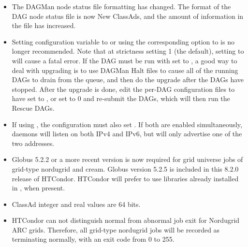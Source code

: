 \begin{itemize}
\item The DAGMan node status file formatting has changed.
The format of the DAG node status file is now New ClassAds,
and the amount of information in the file has increased.

\item Setting configuration variable
 to 
or using the corresponding  option
to  is no longer recommended.
Note that at strictness setting 1 (the default), setting
 to 
will cause a fatal error. 
If the DAG must be run with  
set to ,
a good way to deal with upgrading is to use DAGMan Halt files 
to cause all of the running DAGs to drain from the queue, 
and then do the upgrade after the DAGs have stopped.  
After the upgrade is done, 
edit the per-DAG configuration files to have 
 set to ,
or set  to 0 and 
re-submit the DAGs, which will then run the Rescue DAGs.

\item If using , the configuration must
also set .
If both are enabled simultaneously,
daemons will listen on both IPv4 and IPv6, 
but will only advertise one of the two addresses.

\item Globus 5.2.2 or a more recent version is now required 
for grid universe jobs of grid-type nordugrid and cream.
Globus version 5.2.5 is included in this 8.2.0 release of HTCondor.
HTCondor will prefer to use libraries already installed in ,
when present.

\item ClassAd integer and real values are 64 bits.

\item HTCondor can not distinguish normal from abnormal job exit
for Nordugrid ARC grids.
Therefore, all grid-type nordugrid jobs will be recorded as 
terminating normally, with an exit code from 0 to 255.

\end{itemize}

